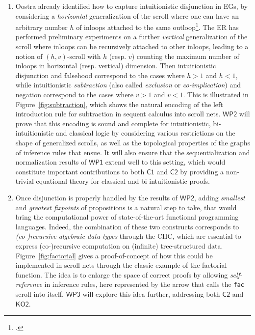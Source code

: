\documentclass[12pt,draftproposal]{msca-pf}
\newcommand{\CH}[1]{$\mathsf{C#1}$}
\newcommand{\KO}[1]{$\mathsf{KO#1}$}
\newcommand{\WP}[1]{$\mathsf{WP#1}$}
\begin{document}
\begin{enumerate}
    \item Oostra already identified how to capture intuitionistic disjunction in EGs, by considering
    a \emph{horizontal} generalization of the scroll where one can have an arbitrary number $h$ of
    inloops attached to the same outloop\footcite{oostra_graficos_2010}. The ER has performed
    preliminary experiments on a further \emph{vertical} generalization of the scroll where inloops
    can be recursively attached to other inloops, leading to a notion of $(h,v)$-scroll with $h$
    (resp. $v$) counting the maximum number of inloops in horizontal (resp. vertical) dimension.
    Then intuitionistic disjunction and falsehood correspond to the cases where $h > 1$ and $h < 1$,
    while intuitionistic \emph{subtraction} (also called \emph{exclusion} or \emph{co-implication})
    and negation correspond to the cases where $v > 1$ and $v < 1$. This is illustrated in
    Figure~\ref{fig:subtraction}, which shows the natural encoding of the left introduction rule for
    subtraction in sequent calculus into scroll nets. \WP{2} will prove that this encoding is sound
    and complete for intuitionistic, bi-intuitionistic and classical logic by considering various
    restrictions on the shape of generalized scrolls, as well as the topological properties of the
    graphs of inference rules that ensue. It will also ensure that the sequentialization and
    normalization results of \WP{1} extend well to this setting, which would constitute important
    contributions to both \CH{1} and \CH{2} by providing a non-trivial equational theory for
    classical and bi-intuitionistic proofs.

    \item Once disjunction is properly handled by the results of \WP{2}, adding \emph{smallest} and
    \emph{greatest fixpoints} of propositions is a natural step to take, that would bring the
    computational power of state-of-the-art functional programming languages. Indeed, the
    combination of these two constructs corresponds to \emph{(co-)recursive algebraic data types}
    through the CHC, which are essential to express (co-)recursive computation on (infinite)
    tree-structured data. Figure~\ref{fig:factorial} gives a proof-of-concept of how this could be
    implemented in scroll nets through the classic example of the factorial function. The idea is to
    enlarge the space of correct proofs by allowing \emph{self-reference} in inference rules, here
    represented by the arrow that calls the \texttt{fac} scroll into itself. \WP{3} will explore
    this idea further, addressing both \CH{2} and \KO{2}. 


\end{enumerate}
\end{document}
